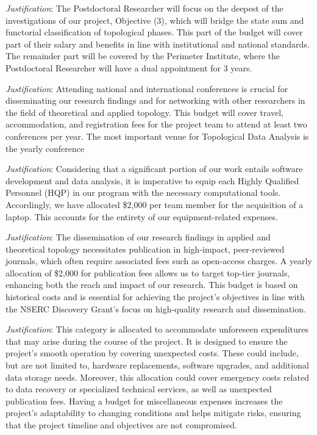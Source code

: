 \documentclass[12pt]{article}
\begin{document}
	\noindent\textit{Justification}:
	The Postdoctoral Researcher will focus on the deepest of the investigations of our project, Objective (3), which will bridge the state sum and functorial classification of topological phases. This part of the budget will cover part of their salary and benefits in line with institutional and national standards. The remainder part will be covered by the Perimeter Institute, where the Postdoctoral Researcher will have a dual appointment for 3 years.

	\bigskip

	\noindent\textit{Justification}:
	Attending national and international conferences is crucial for disseminating our research findings and for networking with other researchers in the field of theoretical and applied topology. This budget will cover travel, accommodation, and registration fees for the project team to attend at least two conferences per year.
	The most important venue for Topological Data Analysis is the yearly conference

	\newpage
	\bigskip

	\noindent\textit{Justification}: Considering that a significant portion of our work entails software development and data analysis, it is imperative to equip each Highly Qualified Personnel (HQP) in our program with the necessary computational tools.
	Accordingly, we have allocated \$2,000 per team member for the acquisition of a laptop.
	This accounts for the entirety of our equipment-related expenses.

	\bigskip

	\noindent\textit{Justification}:
	The dissemination of our research findings in applied and theoretical topology necessitates publication in high-impact, peer-reviewed journals, which often require associated fees such as open-access charges. A yearly allocation of \$2,000 for publication fees allows us to target top-tier journals, enhancing both the reach and impact of our research. This budget is based on historical costs and is essential for achieving the project’s objectives in line with the NSERC Discovery Grant's focus on high-quality research and dissemination.

	\bigskip

	\noindent\textit{Justification}:
	This category is allocated to accommodate unforeseen expenditures that may arise during the course of the project. It is designed to ensure the project's smooth operation by covering unexpected costs. These could include, but are not limited to, hardware replacements, software upgrades, and additional data storage needs. Moreover, this allocation could cover emergency costs related to data recovery or specialized technical services, as well as unexpected publication fees. Having a budget for miscellaneous expenses increases the project's adaptability to changing conditions and helps mitigate risks, ensuring that the project timeline and objectives are not compromised.
\end{document}
